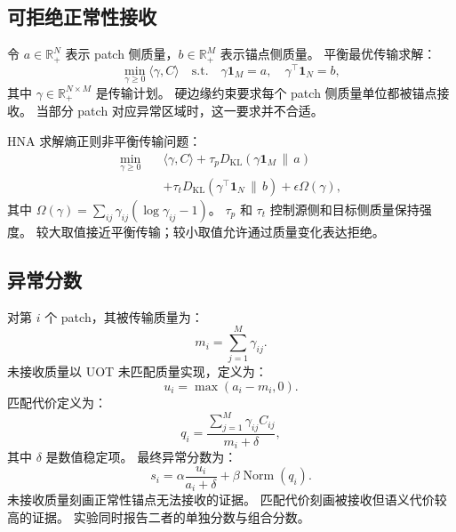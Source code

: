 \documentclass[10pt,fontset=none]{ctexart}
\newcommand{\method}{HNA}
\begin{document}
\subsection{可拒绝正常性接收}

令 $a \in \mathbb{R}_{+}^{N}$ 表示 patch 侧质量，$b \in \mathbb{R}_{+}^{M}$ 表示锚点侧质量。
平衡最优传输求解：
\begin{equation}
    \min_{\gamma \geq 0} \langle \gamma, C \rangle
    \quad
    \mathrm{s.t.}\quad
    \gamma \mathbf{1}_{M}=a,\quad
    \gamma^{\top}\mathbf{1}_{N}=b,
\end{equation}
其中 $\gamma \in \mathbb{R}_{+}^{N \times M}$ 是传输计划。
硬边缘约束要求每个 patch 侧质量单位都被锚点接收。
当部分 patch 对应异常区域时，这一要求并不合适。

\method{} 求解熵正则非平衡传输问题：
\begin{equation}
\begin{split}
    \min_{\gamma \geq 0} \quad
    &\langle \gamma, C \rangle
    + \tau_{p} D_{\mathrm{KL}}(\gamma \mathbf{1}_{M} \,\|\, a) \\
    &+ \tau_{t} D_{\mathrm{KL}}(\gamma^{\top}\mathbf{1}_{N} \,\|\, b)
    + \epsilon \Omega(\gamma),
\end{split}
\label{eq:uot}
\end{equation}
其中 $\Omega(\gamma)=\sum_{ij}\gamma_{ij}(\log \gamma_{ij}-1)$。
$\tau_p$ 和 $\tau_t$ 控制源侧和目标侧质量保持强度。
较大取值接近平衡传输；较小取值允许通过质量变化表达拒绝。

\subsection{异常分数}

对第 $i$ 个 patch，其被传输质量为：
\begin{equation}
    m_i = \sum_{j=1}^{M} \gamma_{ij}.
\end{equation}
未接收质量以 UOT 未匹配质量实现，定义为：
\begin{equation}
    u_i = \max(a_i - m_i, 0).
\end{equation}
匹配代价定义为：
\begin{equation}
    q_i = \frac{\sum_{j=1}^{M} \gamma_{ij} C_{ij}}{m_i+\delta},
\end{equation}
其中 $\delta$ 是数值稳定项。
最终异常分数为：
\begin{equation}
    s_i = \alpha \frac{u_i}{a_i+\delta} + \beta \operatorname{Norm}(q_i).
\end{equation}
未接收质量刻画正常性锚点无法接收的证据。
匹配代价刻画被接收但语义代价较高的证据。
实验同时报告二者的单独分数与组合分数。
\end{document}

